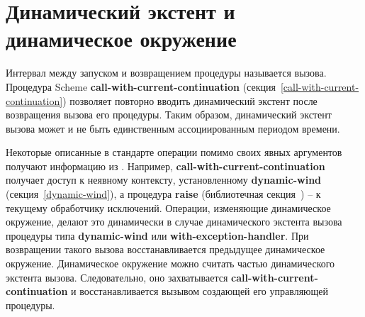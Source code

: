 \section{Динамический экстент и динамическое окружение}\vspace{-2.2mm}
\label{dynamicenvironmentsection}

Интервал между запуском и возвращением процедуры называется 
вызова. Процедура Scheme {\cf\bfseries call-with-current-continuation}
(секция~\ref{call-with-current-continuation}) позволяет повторно вводить динамический экстент
после возвращения вызова его процедуры. Таким образом, динамический экстент вызова может и не быть
единственным ассоциированным периодом времени.

Некоторые описанные в стандарте операции помимо своих явных аргументов получают информацию
из . Например, {\bfseries\cf
  call-\hp{}with-\hp{}current-\hp{}continuation} получает доступ к неявному контексту,
установленному {\bfseries\cf dynamic-wind} (секция~\ref{dynamic-wind}), а процедура {\bfseries\cf raise}
(библиотечная секция~) -- к текущему
обработчику исключений. Операции, изменяющие динамическое окружение, делают
это динамически в случае динамического экстента вызова процедуры типа {\bfseries\cf dynamic-wind} или
{\bfseries\cf with-exception-handler}. При возвращении такого вызова восстанавливается предыдущее динамическое
окружение. Динамическое окружение можно считать частью
динамического экстента вызова. Следовательно, оно захватывается {\bfseries\cf call-with-current-continuation}
и восстанавливается вызывом создающей его управляющей процедуры.\vspace{-2.2mm}


